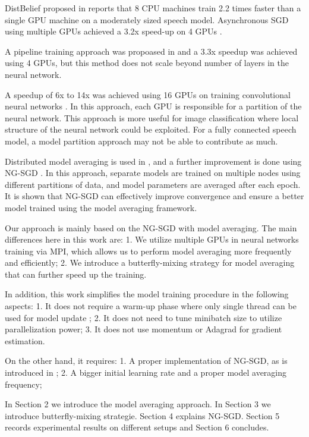\documentclass{article}
\begin{document}
DistBelief proposed in \cite{dean2012large} reports that 8 CPU machines train 2.2 times faster than a single GPU machine on a
moderately sized speech model. Asynchronous SGD using multiple GPUs achieved a 3.2x speed-up on 4 GPUs \cite{zhang2013asynchronous}.

A pipeline training approach was propoased in \cite{chen2012pipelined} and a 3.3x speedup was achieved using 4 GPUs, but this
method does not scale beyond number of layers in the neural network.

A speedup of 6x to 14x was achieved using 16 GPUs on training convolutional neural networks \cite{coates2013deep}. In this approach,
each GPU is responsible for a partition of the neural network. This approach is more useful for image classification where 
local structure of the neural network could be exploited. For a fully connected speech model, a model partition approach 
may not be able to contribute as much.

Distributed model averaging is used in \cite{zhang2014improving,miao2014distributed}, and a further improvement 
is done using NG-SGD \cite{povey2014parallel}. In this approach, separate models are trained on multiple nodes using 
different partitions of data, and model parameters are averaged after each epoch. It is shown that NG-SGD can effectively improve
convergence and ensure a better model trained using the model averaging framework.

Our approach is mainly based on the NG-SGD with model averaging. The main differences here in this work are:
1. We utilize multiple GPUs in neural networks training via MPI, which allows us to perform model averaging more frequently and efficiently;
2. We introduce a butterfly-mixing strategy for model averaging that can further speed up the training.

In addition, this work simplifies the model training procedure in the following aspects:
1. It does not require a warm-up phase where only single thread can be used for model update \cite{seide20141,povey2014parallel};
2. It does not need to tune minibatch size to utilize parallelization power;
3. It does not use momentum or Adagrad\cite{duchi2011adaptive} for gradient estimation.

On the other hand, it requires:
1. A proper implementation of NG-SGD, as is introduced in \cite{povey2014parallel};
2. A bigger initial learning rate and a proper model averaging frequency;

In Section 2 we introduce the model averaging approach. In Section 3 we introduce butterfly-mixing strategie. Section 4 
explains NG-SGD. Section 5 records experimental results on different setups and Section 6 concludes.
\end{document}
